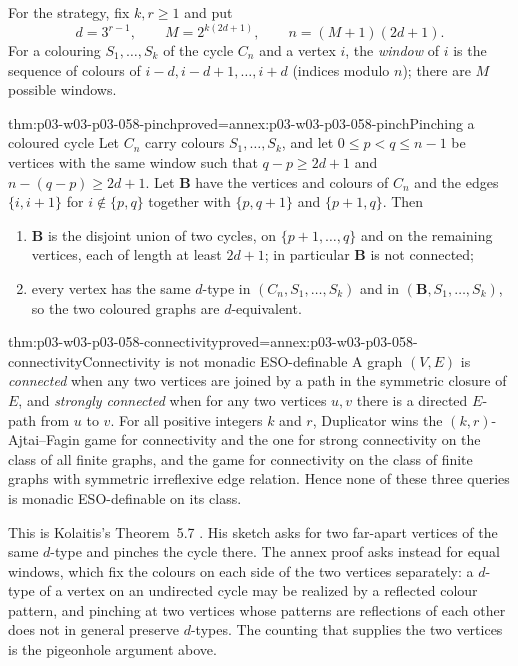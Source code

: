 For the strategy, fix \(k,r\ge1\) and put
\[
 d=3^{r-1},\qquad M=2^{k(2d+1)},\qquad n=(M+1)(2d+1).
\]
For a colouring \(S_1,\ldots,S_k\) of the cycle \(C_n\) and a vertex \(i\),
the \emph{window} of \(i\) is the sequence of colours of
\(i-d,i-d+1,\ldots,i+d\) (indices modulo \(n\)); there are \(M\) possible
windows.

\begin{hblemma}{thm:p03-w03-p03-058-pinch}{proved=annex:p03-w03-p03-058-pinch}{Pinching a coloured cycle}
Let \(C_n\) carry colours \(S_1,\ldots,S_k\), and let
\(0\le p<q\le n-1\) be vertices with the same window such that
\(q-p\ge2d+1\) and \(n-(q-p)\ge2d+1\). Let \(\mathbf B\) have the vertices
and colours of \(C_n\) and the edges \(\{i,i+1\}\) for
\(i\notin\{p,q\}\) together with \(\{p,q+1\}\) and \(\{p+1,q\}\). Then
\begin{enumerate}
\item \(\mathbf B\) is the disjoint union of two cycles, on
      \(\{p+1,\ldots,q\}\) and on the remaining vertices, each of length at
      least \(2d+1\); in particular \(\mathbf B\) is not connected;
\item every vertex has the same \(d\)-type in \((C_n,S_1,\ldots,S_k)\) and
      in \((\mathbf B,S_1,\ldots,S_k)\), so the two coloured graphs are
      \(d\)-equivalent.
\end{enumerate}
\end{hblemma}

\begin{hbtheorem}{thm:p03-w03-p03-058-connectivity}{proved=annex:p03-w03-p03-058-connectivity}{Connectivity is not monadic ESO-definable}
A graph \((V,E)\) is \emph{connected} when any two vertices are joined by a
path in the symmetric closure of \(E\), and \emph{strongly connected} when
for any two vertices \(u,v\) there is a directed \(E\)-path from \(u\) to
\(v\). For all positive integers \(k\) and \(r\), Duplicator wins the
\((k,r)\)-Ajtai--Fagin game for connectivity and the one for strong
connectivity on the class of all finite graphs, and the game for
connectivity on the class of finite graphs with symmetric irreflexive edge
relation. Hence none of these three queries is monadic ESO-definable on its
class.
\end{hbtheorem}

This is Kolaitis's Theorem~5.7 \cite[pp.~28--29]{Kolaitis2003ExpressivePowerNotes}.
His sketch asks for two far-apart vertices of the same \(d\)-type and pinches
the cycle there. The annex proof asks instead for equal windows, which fix
the colours on each side of the two vertices separately: a \(d\)-type of a
vertex on an undirected cycle may be realized by a reflected colour pattern,
and pinching at two vertices whose patterns are reflections of each other
does not in general preserve \(d\)-types. The counting that supplies the
two vertices is the pigeonhole argument above.

